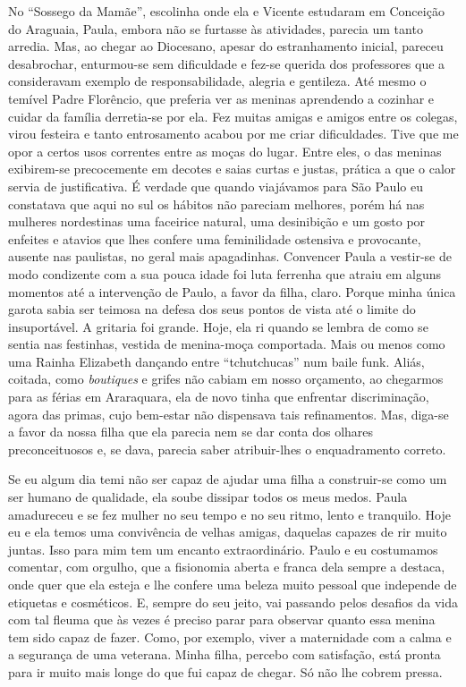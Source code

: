 No ``Sossego da Mamãe'', escolinha onde ela e Vicente estudaram em Conceição do Araguaia, Paula, embora não se furtasse às atividades, parecia um tanto arredia.
Mas, ao chegar ao Diocesano, apesar do estranhamento inicial, pareceu desabrochar, enturmou-se sem dificuldade e fez-se querida dos professores que a consideravam exemplo de responsabilidade, alegria e gentileza.
Até mesmo o temível Padre Florêncio, que preferia ver as meninas aprendendo a cozinhar e cuidar da família derretia-se por ela.
Fez muitas amigas e amigos entre os colegas, virou festeira e tanto entrosamento acabou por me criar dificuldades.
Tive que me opor a certos usos correntes entre as moças do lugar.
Entre eles, o das meninas exibirem-se precocemente em decotes e saias curtas e justas, prática a que o calor servia de justificativa.
É verdade que quando viajávamos para São Paulo eu constatava que aqui no sul os hábitos não pareciam melhores, porém há nas mulheres nordestinas uma faceirice natural, uma desinibição e um gosto por enfeites e atavios que lhes confere uma feminilidade ostensiva e provocante, ausente nas paulistas, no geral mais apagadinhas.
Convencer Paula a vestir-se de modo condizente com a sua pouca idade foi luta ferrenha que atraiu em alguns momentos até a intervenção de Paulo, a favor da filha, claro.
Porque minha única garota sabia ser teimosa na defesa dos seus pontos de vista até o limite do insuportável.
A gritaria foi grande.
Hoje, ela ri quando se lembra de como se sentia nas festinhas, vestida de menina-moça comportada.
Mais ou menos como uma Rainha Elizabeth dançando entre ``tchutchucas'' num baile funk.
Aliás, coitada, como \textit{boutiques} e grifes não cabiam em nosso orçamento, ao chegarmos para as férias em Araraquara, ela de novo tinha que enfrentar discriminação, agora das primas, cujo bem-estar não dispensava tais refinamentos.
Mas, diga-se a favor da nossa filha que ela parecia nem se dar conta dos olhares preconceituosos e, se dava, parecia saber atribuir-lhes o enquadramento correto.

Se eu algum dia temi não ser capaz de ajudar uma filha a construir-se como um ser humano de qualidade, ela soube dissipar todos os meus medos.
Paula amadureceu e se fez mulher no seu tempo e no seu ritmo, lento e tranquilo.
Hoje eu e ela temos uma convivência de velhas amigas, daquelas capazes de rir muito juntas.
Isso para mim tem um encanto extraordinário.
Paulo e eu costumamos comentar, com orgulho, que a fisionomia aberta e franca dela sempre a destaca, onde quer que ela esteja e lhe confere uma beleza muito pessoal que independe de etiquetas e cosméticos.
E, sempre do seu jeito, vai passando pelos desafios da vida com tal fleuma que às vezes é preciso parar para observar quanto essa menina tem sido capaz de fazer.
Como, por exemplo, viver a maternidade com a calma e a segurança de uma veterana.
Minha filha, percebo com satisfação, está pronta para ir muito mais longe do que fui capaz de chegar.
Só não lhe cobrem pressa.

